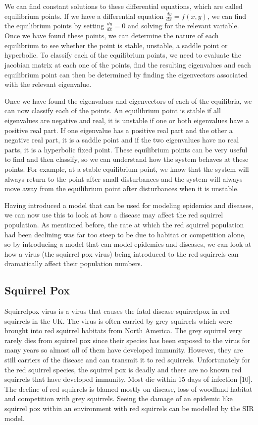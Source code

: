 \documentclass{article}
\begin{document}
We can find constant solutions to these differential equations, which are called equilibrium points. If we have a differential equation $\frac{dy}{dx} = f(x,y)$, we can find the equilibrium points by setting $\frac{dy}{dx}=0$ and solving for the relevant variable. Once we have found these points, we can determine the nature of each equilibrium to see whether the point is stable, unstable, a saddle point or hyperbolic. To classify each of the equilibrium points, we need to evaluate the jacobian matrix at each one of the points, find the resulting eigenvalues and each equilibrium point can then be determined by finding the eigenvectors associated with the relevant eigenvalue.
 
Once we have found the eigenvalues and eigenvectors of each of the equilibria, we can now classify each of the points. An equilibrium point is stable if all eigenvalues are negative and real, it is unstable if one or both eigenvalues have a positive real part. If one eigenvalue has a positive real part and the other a negative real part, it is a saddle point and if the two eigenvalues have no real parts, it is a hyperbolic fixed point. These equilibrium points can be very useful to find and then classify, so we can understand how the system behaves at these points. For example, at a stable equilibrium point, we know that the system will always return to the point after small disturbances and the system will always move away from the equilibrium point after disturbances when it is unstable.

Having introduced a model that can be used for modeling epidemics and diseases, we can now use this to look at how a disease may affect the red squirrel population. As mentioned before, the rate at which the red squirrel population had been declining was far too steep to be due to habitat or competition alone, so by introducing a model that can model epidemics and diseases, we can look at how a virus (the squirrel pox virus) being introduced to the red squirrels can dramatically affect their population numbers.

\subsection{\textbf{Squirrel Pox}}

Squirrelpox virus is a virus that causes the fatal disease squirrelpox in red squirrels in the UK. The virus is often carried by grey squirrels which were brought into red squirrel habitats from North America. The grey squirrel very rarely dies from squirrel pox since their species has been exposed to the virus for many years so almost all of them have developed immunity. However, they are still carriers of the disease and can transmit it to red squirrels. Unfortunately for the red squirrel species, the squirrel pox is deadly and there are no known red squirrels that have developed immunity. Most die within 15 days of infection [10]. The decline of red squirrels is blamed mostly on disease, loss of woodland habitat and competition with grey squirrels. Seeing the damage of an epidemic like squirrel pox within an environment with red squirrels can be modelled by the SIR model. 
\end{document}
